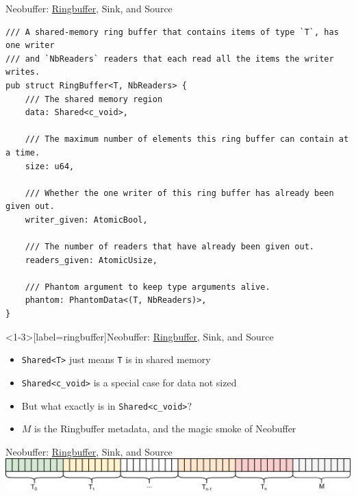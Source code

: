 \documentclass[aspectratio=43]{beamer}
\begin{document}
\begin{frame}[fragile]{Neobuffer: \underline{Ringbuffer}, Sink, and Source}
    \begin{verbatim}
/// A shared-memory ring buffer that contains items of type `T`, has one writer
/// and `NbReaders` readers that each read all the items the writer writes.
pub struct RingBuffer<T, NbReaders> {
    /// The shared memory region
    data: Shared<c_void>,

    /// The maximum number of elements this ring buffer can contain at a time.
    size: u64,

    /// Whether the one writer of this ring buffer has already been given out.
    writer_given: AtomicBool,

    /// The number of readers that have already been given out.
    readers_given: AtomicUsize,

    /// Phantom argument to keep type arguments alive.
    phantom: PhantomData<(T, NbReaders)>,
}
    \end{verbatim}
\end{frame}

\begin{frame}<1-3>[label=ringbuffer]{Neobuffer: \underline{Ringbuffer}, Sink, and Source}
    \begin{itemize}
        \item<1-> \texttt{Shared<T>} just means \texttt{T} is in shared memory
        \item<2-> \texttt{Shared<c\_void>} is a special case for data not sized
        \item<3-> But what exactly is in \texttt{Shared<c\_void>}?
        \item<4-> $M$ is the Ringbuffer metadata, and the magic smoke of
            Neobuffer
    \end{itemize}
\end{frame}

\begin{frame}[fragile]{Neobuffer: \underline{Ringbuffer}, Sink, and Source}
    \centering
    \includegraphics[width=\textwidth]{./imgs/neobuffer_layout.png}
\end{frame}

\end{document}

